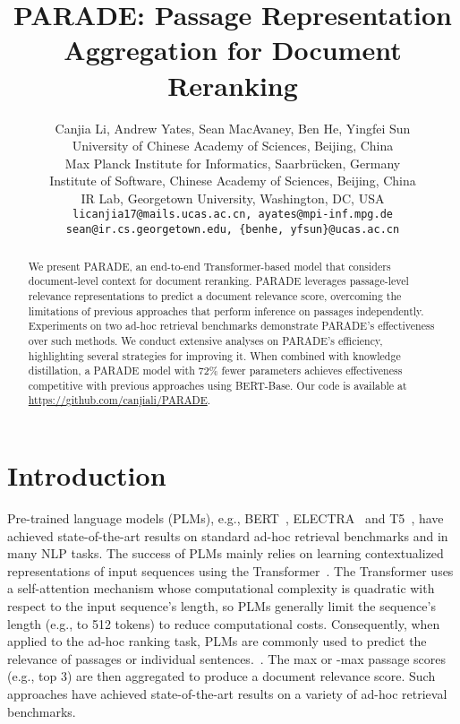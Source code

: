 \documentclass[11pt,a4paper]{article}
\title{PARADE: Passage Representation Aggregation for Document Reranking}
\author{
Canjia Li, Andrew Yates, Sean MacAvaney, Ben He, Yingfei Sun \\
	 University of Chinese Academy of Sciences, Beijing, China \hspace{0.3cm}\\ 
	 Max Planck Institute for Informatics, Saarbr\"ucken, Germany \\
	 Institute of Software, Chinese Academy of Sciences, Beijing, China\\
     IR Lab, Georgetown University, Washington, DC, USA\\
    \texttt{licanjia17@mails.ucas.ac.cn, ayates@mpi-inf.mpg.de}\\
    \texttt{sean@ir.cs.georgetown.edu, \{benhe, yfsun\}@ucas.ac.cn}
}
\begin{document}
\maketitle
\begin{abstract}
We present PARADE, an end-to-end Transformer-based model that considers document-level context for document reranking.
PARADE leverages passage-level relevance representations to predict a document relevance score, overcoming the limitations of previous approaches that perform inference on passages independently.
Experiments on two ad-hoc retrieval benchmarks demonstrate PARADE's effectiveness over such methods.
We conduct extensive analyses on PARADE's efficiency, highlighting several strategies for improving it.
When combined with knowledge distillation, a PARADE model with 72\% fewer parameters achieves effectiveness competitive with previous approaches using BERT-Base.
Our code is available at \url{https://github.com/canjiali/PARADE}.
\end{abstract}

\section{Introduction} \label{sec.introduction}
Pre-trained language models (PLMs), e.g., BERT~\cite{DBLP:conf/naacl/DevlinCLT19}, ELECTRA~\cite{DBLP:conf/iclr/ClarkLLM20} and T5~\cite{DBLP:journals/corr/abs-1910-10683}, have achieved state-of-the-art results on standard ad-hoc retrieval benchmarks and in many NLP tasks.
The success of PLMs mainly relies on learning contextualized representations of input sequences using the Transformer~\cite{DBLP:conf/nips/VaswaniSPUJGKP17}.
The Transformer uses a self-attention mechanism whose computational complexity is quadratic with respect to the input sequence's length, so PLMs generally limit the sequence's length (e.g., to 512 tokens) to reduce computational costs.
Consequently, when applied to the ad-hoc ranking task, PLMs are commonly used to predict the relevance of passages or individual sentences.~\cite{DBLP:conf/sigir/DaiC19,DBLP:conf/emnlp/YilmazWYZL19}.
The max or -max passage scores (e.g., top 3) are then aggregated to produce a document relevance score.
Such approaches have achieved state-of-the-art results on a variety of ad-hoc retrieval benchmarks.
\end{document}
